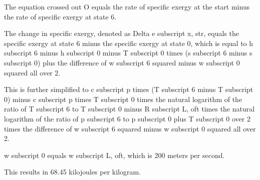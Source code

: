 The equation crossed out O equals the rate of specific exergy at the start minus the rate of specific exergy at state 6.

The change in specific exergy, denoted as Delta e subscript x, str, equals the specific exergy at state 6 minus the specific exergy at state 0, which is equal to h subscript 6 minus h subscript 0 minus T subscript 0 times (s subscript 6 minus s subscript 0) plus the difference of w subscript 6 squared minus w subscript 0 squared all over 2.

This is further simplified to c subscript p times (T subscript 6 minus T subscript 0) minus c subscript p times T subscript 0 times the natural logarithm of the ratio of T subscript 6 to T subscript 0 minus R subscript L, oft times the natural logarithm of the ratio of p subscript 6 to p subscript 0 plus T subscript 0 over 2 times the difference of w subscript 6 squared minus w subscript 0 squared all over 2.

w subscript 0 equals w subscript L, oft, which is 200 meters per second.

This results in 68.45 kilojoules per kilogram.
